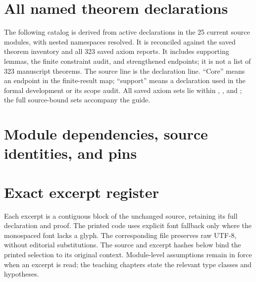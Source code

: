 
\clearpage\section{All named theorem declarations}\label{sec:catalog}
The following catalog is derived from active declarations in the 25 current source modules, with nested namespaces resolved. It is reconciled against the saved theorem inventory and all 323 saved axiom reports. It includes supporting lemmas, the finite constraint audit, and strengthened endpoints; it is not a list of 323 manuscript theorems. The source line is the declaration line. ``Core'' means an endpoint in the finite-result map; ``support'' means a declaration used in the formal development or its scope audit. All saved axiom sets lie within , , and ; the full source-bound sets accompany the guide.

\clearpage\section{Module dependencies, source identities, and pins}\label{sec:dependencies}

\clearpage\section{Exact excerpt register}\label{sec:excerpts}
Each excerpt is a contiguous block of the unchanged source, retaining its full declaration and proof. The printed code uses explicit font fallback only where the monospaced font lacks a glyph. The corresponding  file preserves raw UTF-8, without editorial substitutions. The source and excerpt hashes below bind the printed selection to its original context. Module-level assumptions remain in force when an excerpt is read; the teaching chapters state the relevant type classes and hypotheses.



